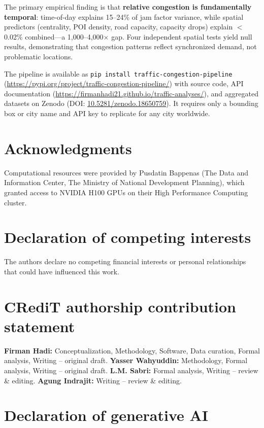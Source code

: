 \documentclass[preprint,12pt,authoryear]{elsarticle}
\begin{document}
The primary empirical finding is that \textbf{relative congestion is fundamentally temporal}: time-of-day explains 15--24\% of jam factor variance, while spatial predictors (centrality, POI density, road capacity, capacity drops) explain $<$0.02\% combined---a 1,000--4,000$\times$ gap. Four independent spatial tests yield null results, demonstrating that congestion patterns reflect synchronized demand, not problematic locations.

The pipeline is available as \texttt{pip install traffic-congestion-pipeline} (\url{https://pypi.org/project/traffic-congestion-pipeline/}) with source code, API documentation (\url{https://firmanhadi21.github.io/traffic-analyses/}), and aggregated datasets on Zenodo (DOI: \href{https://doi.org/10.5281/zenodo.18650759}{10.5281/zenodo.18650759}). It requires only a bounding box or city name and API key to replicate for any city worldwide.


\section*{Acknowledgments}

Computational resources were provided by Pusdatin Bappenas (The Data and Information Center, The Ministry of National Development Planning), which granted access to NVIDIA H100 GPUs on their High Performance Computing cluster.

\section*{Declaration of competing interests}

The authors declare no competing financial interests or personal relationships that could have influenced this work.

\section*{CRediT authorship contribution statement}

\textbf{Firman Hadi:} Conceptualization, Methodology, Software, Data curation, Formal analysis, Writing -- original draft. \textbf{Yasser Wahyuddin:} Methodology, Formal analysis, Writing -- original draft. \textbf{L.M. Sabri:} Formal analysis, Writing -- review \& editing. \textbf{Agung Indrajit:} Writing -- review \& editing.

\section*{Declaration of generative AI}
\end{document}
